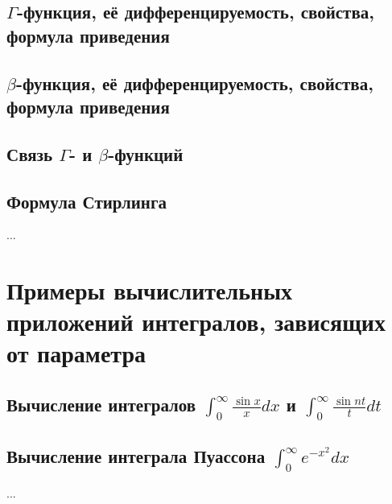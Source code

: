 \subsection{$\Gamma$-функция, её дифференцируемость, свойства, формула приведения}
\subsection{$\beta$-функция, её дифференцируемость, свойства, формула приведения}
\subsection{Связь $\Gamma$- и $\beta$-функций}
\subsection{Формула Стирлинга}
...

\section{Примеры вычислительных приложений интегралов, зависящих от параметра}
\subsection{Вычисление интегралов $\int_0^\infty \frac{\sin x}{x} dx$ и $\int_0^\infty \frac{\sin nt}{t} dt$}
\subsection{Вычисление интеграла Пуассона $\int_0^\infty e^{-x^2} dx$}
...
